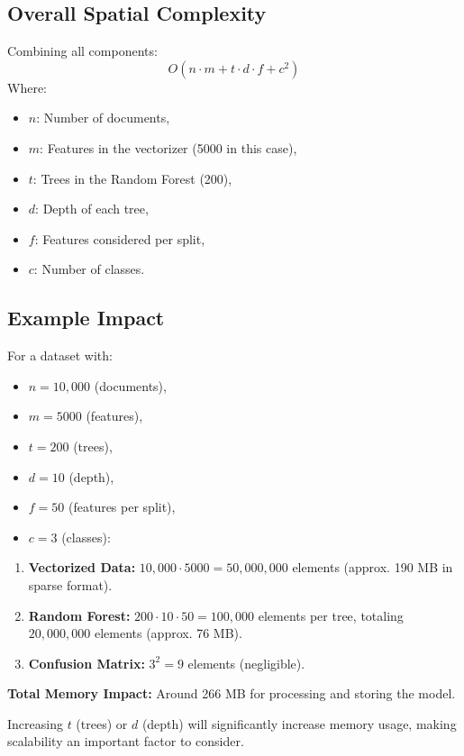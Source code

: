 \documentclass[runningheads,a4paper,11pt]{report}
\begin{document}
\subsection{Overall Spatial Complexity}
\label{section:overall-spatial}
Combining all components:
\[
O(n \cdot m + t \cdot d \cdot f + c^2)
\]
Where:
\begin{itemize}
  \item $n$: Number of documents,
  \item $m$: Features in the vectorizer (5000 in this case),
  \item $t$: Trees in the Random Forest (200),
  \item $d$: Depth of each tree,
  \item $f$: Features considered per split,
  \item $c$: Number of classes.
\end{itemize}

\subsection{Example Impact}
\label{section:example-spatial}
For a dataset with:
\begin{itemize}
  \item $n = 10,000$ (documents),
  \item $m = 5000$ (features),
  \item $t = 200$ (trees),
  \item $d = 10$ (depth),
  \item $f = 50$ (features per split),
  \item $c = 3$ (classes):
\end{itemize}

\begin{enumerate}
  \item \textbf{Vectorized Data:} $10,000 \cdot 5000 = 50,000,000$ elements (approx. 190 MB in sparse format).
  \item \textbf{Random Forest:} $200 \cdot 10 \cdot 50 = 100,000$ elements per tree, totaling $20,000,000$ elements (approx. 76 MB).
  \item \textbf{Confusion Matrix:} $3^2 = 9$ elements (negligible).
\end{enumerate}

\textbf{Total Memory Impact:} Around 266 MB for processing and storing the model.

Increasing $t$ (trees) or $d$ (depth) will significantly increase memory usage, making scalability an important factor to consider.
\end{document}
